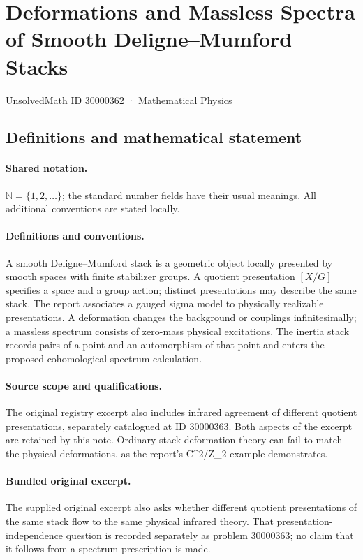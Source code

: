 \documentclass[11pt]{article}
\begin{document}
\setcounter{section}{30000361}
\section{Deformations and Massless Spectra of Smooth Deligne–Mumford Stacks}\label{30000362}
{\small UnsolvedMath ID 30000362 · Mathematical Physics}
\subsection{Definitions and mathematical statement}

\paragraph{Shared notation.}$\mathbb N=\{1,2,\ldots\}$; the standard number fields have their usual meanings. All additional conventions are stated locally.


\paragraph{Definitions and conventions.} A smooth Deligne--Mumford stack is a geometric object locally presented by smooth spaces with finite stabilizer groups. A quotient presentation $[X/G]$ specifies a space and a group action; distinct presentations may describe the same stack. The report associates a gauged sigma model to physically realizable presentations. A deformation changes the background or couplings infinitesimally; a massless spectrum consists of zero-mass physical excitations. The inertia stack records pairs of a point and an automorphism of that point and enters the proposed cohomological spectrum calculation.

\paragraph{Source scope and qualifications.} The original registry excerpt also includes infrared agreement of different quotient presentations, separately catalogued at ID 30000363. Both aspects of the excerpt are retained by this note. Ordinary stack deformation theory can fail to match the physical deformations, as the report's C^2/Z\_2 example demonstrates.

\paragraph{Bundled original excerpt.} The supplied original excerpt also asks whether different quotient presentations of the same stack flow to the same physical infrared theory. That presentation-independence question is recorded separately as problem 30000363; no claim that it follows from a spectrum prescription is made.
\end{document}
